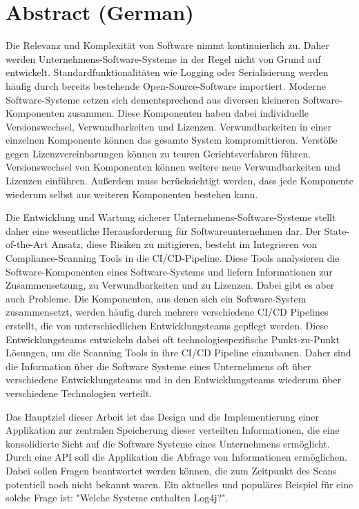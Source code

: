 
\titlespacing*{\chapter}{0pt}{0pt}{40pt}
\pagestyle{plain}
\chapter*{Abstract (German)}
Die Relevanz und Komplexität von Software nimmt kontinuierlich zu. Daher werden Unternehmens-Software-Systeme in der Regel nicht von Grund auf entwickelt. Standardfunktionalitäten wie Logging oder Serialisierung werden häufig durch bereits bestehende Open-Source-Software importiert. Moderne Software-Systeme setzen sich dementsprechend aus diversen kleineren Software-Komponenten zusammen. Diese Komponenten haben dabei individuelle Versionswechsel, Verwundbarkeiten und Lizenzen. Verwundbarkeiten in einer einzelnen Komponente können das gesamte System kompromittieren. Verstöße gegen Lizenzvereinbarungen können zu teuren Gerichtsverfahren führen. Versionswechsel von Komponenten können weitere neue Verwundbarkeiten und Lizenzen einführen. Außerdem muss berücksichtigt werden, dass jede Komponente wiederum selbst aus weiteren Komponenten bestehen kann.\par
Die Entwicklung und Wartung sicherer Unternehmens-Software-Systeme stellt daher eine wesentliche Herausforderung für Softwareunternehmen dar. Der State-of-the-Art Ansatz, diese Risiken zu mitigieren, besteht im Integrieren von Compliance-Scanning Tools in die CI/CD-Pipeline. Diese Tools analysieren die Software-Komponenten eines Software-Systems und liefern Informationen zur Zusammensetzung, zu Verwundbarkeiten und zu Lizenzen. Dabei gibt es aber auch Probleme. Die Komponenten, aus denen sich ein Software-System zusammensetzt, werden häufig durch mehrere verschiedene CI/CD Pipelines erstellt, die von unterschiedlichen Entwicklungsteams gepflegt werden. Diese Entwicklungsteams entwickeln dabei oft technologiespezifische Punkt-zu-Punkt Lösungen, um die Scanning Tools in ihre CI/CD Pipeline einzubauen. Daher sind die Information über die Software Systeme eines Unternehmens oft über verschiedene Entwicklungsteams und in den Entwicklungsteams wiederum über verschiedene Technologien verteilt.\par
Das Hauptziel dieser Arbeit ist das Design und die Implementierung einer Applikation zur zentralen Speicherung dieser verteilten Informationen, die eine konsolidierte Sicht auf die Software Systeme eines Unternehmens ermöglicht. Durch eine API soll die Applikation die Abfrage von Informationen ermöglichen. Dabei sollen Fragen beantwortet werden können, die zum Zeitpunkt des Scans potentiell noch nicht bekannt waren. Ein aktuelles und populäres Beispiel für eine solche Frage ist: "Welche Systeme enthalten Log4j?".
